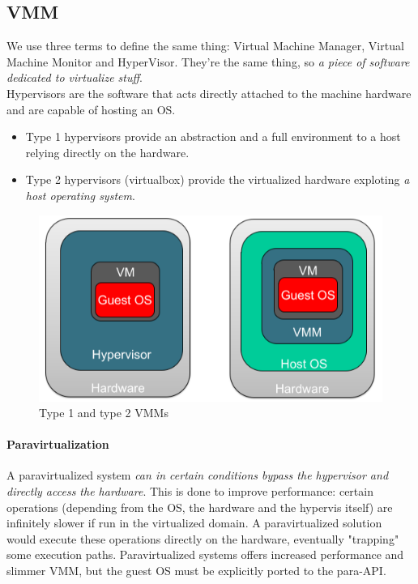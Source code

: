 \documentclass{article}
\begin{document}
			\subsection{VMM}
				We use three terms to define the same thing: Virtual Machine Manager, Virtual Machine Monitor and HyperVisor. They're the same thing, so \emph{a piece of software dedicated to virtualize stuff}.\\
				Hypervisors are the software that acts directly attached to the machine hardware and are capable of hosting an OS.
				\begin{itemize}
					\item Type 1 hypervisors provide an abstraction and a full environment to a host relying directly on the hardware.
					\item Type 2 hypervisors (virtualbox) provide the virtualized hardware exploting \emph{a host operating system}.
				\end{itemize}
				\begin{figure}[H]
					\centering
					\includegraphics[width = \textwidth]{./images/VMMs.png}
					\caption{Type 1 and type 2 VMMs}
				\end{figure}
				
				\paragraph{Paravirtualization}
					A paravirtualized system \emph{can in certain conditions bypass the hypervisor and directly access the hardware}. This is done to improve performance: certain operations (depending from the OS, the hardware and the hypervis itself) are infinitely slower if run in the virtualized domain. A paravirtualized solution would execute these operations directly on the hardware, eventually "trapping" some execution paths. Paravirtualized systems offers increased performance and slimmer VMM, but the guest OS must be explicitly ported to the para-API.
				
\end{document}
